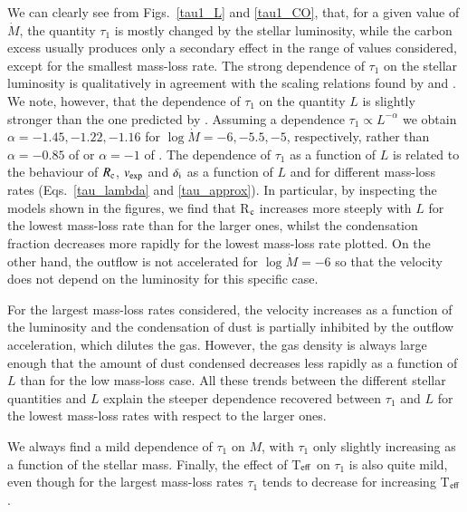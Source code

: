 \documentclass[useAMS,usenatbib]{mn2e/mn2e}
\begin{document}
We can clearly see from Figs.~\ref{tau1_L} and \ref{tau1_CO}, that, for a given value of $\dot{M}$, the quantity $\tau_1$ is mostly changed by the stellar luminosity, while the carbon excess usually produces only a secondary effect in the range of values considered, except for the smallest mass-loss rate. 
The strong dependence of $\tau_1$ on the stellar luminosity is qualitatively in agreement with the scaling relations found by \citet{Bressan98} and \citet{Ivezic10}.
We note, however, that the dependence of $\tau_1$ on the quantity $L$ is slightly stronger than the one predicted by \citet{Bressan98,Ivezic10}. Assuming a dependence $\tau_1\propto L^{-\alpha}$ we obtain $\alpha=-1.45, -1.22, -1.16$ for $\log\dot{M}=-6, -5.5,-5$, respectively, rather than $\alpha=-0.85$ of \citet{Bressan98} or $\alpha=-1$ of \citet{Ivezic10}.
The dependence of $\tau_1$ as a function of $L$ is related to the behaviour of $R_{\rm c}$, $v_{\rm exp}$ and $\delta_{\rm i}$ as a function of $L$ and for different mass-loss rates (Eqs.~\ref{tau_lambda} and \ref{tau_approx}).
In particular, by inspecting the models shown in the figures, we find that R$_{\rm c}$ increases more steeply with $L$ for the lowest mass-loss rate than for the larger ones, whilst the condensation fraction decreases more rapidly for the lowest mass-loss rate plotted.
On the other hand, the outflow is not accelerated for $\log\dot{M}=-6$ so that the velocity does not depend on the luminosity for this specific case. 

For the largest mass-loss rates considered, the velocity increases as a function of the luminosity and the condensation of dust is partially inhibited by the outflow acceleration, which dilutes the gas. 
However, the gas density is always large enough that the amount of dust condensed decreases less rapidly as a function of $L$ than for the low mass-loss case.
All these trends between the different stellar quantities and $L$ explain the steeper dependence recovered between $\tau_1$ and $L$ for the lowest mass-loss rates with respect to the larger ones.

We always find a mild dependence of $\tau_1$ on $M$, with $\tau_1$ only slightly increasing as a function of the stellar mass.
Finally, the effect of T$_{\rm eff}$ on $\tau_1$ is also quite mild, even though for the largest mass-loss rates $\tau_1$ tends to decrease for increasing T$_{\rm eff}$.
\end{document}
